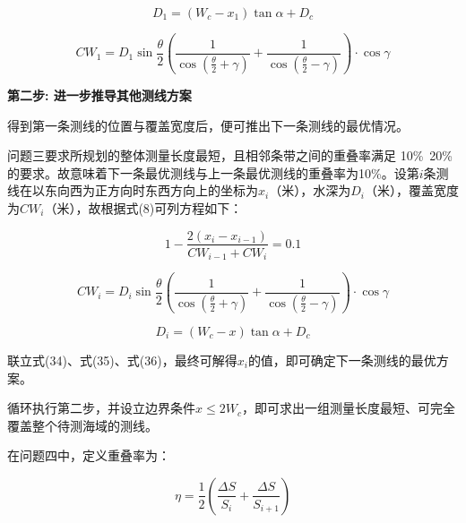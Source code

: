 \begin{equation}
    D_1 =  (W_c - x_1) \tan{\alpha} + D_c
\end{equation}

\begin{equation}
    CW_1 = D_1\sin\frac{\theta}{2}\left(\frac{1}{\cos(\frac{\theta}{2}+\gamma)} + \frac{1}{\cos(\frac{\theta}{2}-\gamma)}\right) \cdot \cos \gamma
\end{equation}

\textbf{第二步: 进一步推导其他测线方案}

得到第一条测线的位置与覆盖宽度后，便可推出下一条测线的最优情况。

问题三要求所规划的整体测量长度最短，且相邻条带之间的重叠率满足 10\%~20\% 的要求。故意味着下一条最优测线与上一条最优测线的重叠率为10\%。设第$i$条测线在以东向西为正方向时东西方向上的坐标为$x_i$（米），水深为$D_i$（米），覆盖宽度为$CW_i$（米），故根据式(8)可列方程如下：

\begin{equation}
    1-\frac{2(x_i-x_{i-1})}{CW_{i-1}+CW_i} = 0.1
\end{equation}

\begin{equation}
    CW_i = D_i\sin\frac{\theta}{2}\left(\frac{1}{\cos(\frac{\theta}{2}+\gamma)} + \frac{1}{\cos(\frac{\theta}{2}-\gamma)}\right) \cdot \cos \gamma
\end{equation}

\begin{equation}
    D_i =  (W_c - x) \tan{\alpha} + D_c
\end{equation}

联立式(34)、式(35)、式(36)，最终可解得$x_i$的值，即可确定下一条测线的最优方案。

循环执行第二步，并设立边界条件$ x \leq 2W_c $，即可求出一组测量长度最短、可完全覆盖整个待测海域的测线。





在问题四中，定义重叠率为：

\begin{equation}
    \eta = \frac{1}{2} \left( \frac{\Delta S}{S_i} + \frac{\Delta S}{S_{i+1}} \right)
\end{equation}

